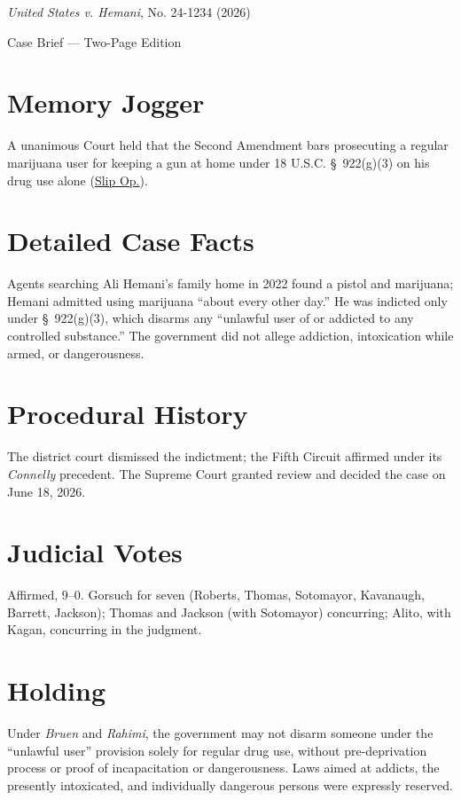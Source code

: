 \documentclass[12pt]{article}
\begin{document}
\begin{center}
{\LARGE \textit{United States v. Hemani}, No. 24-1234 (2026)\par}
\vspace{0.5em}
{\large Case Brief --- Two-Page Edition\par}
\end{center}

\section{Memory Jogger}
A unanimous Court held that the Second Amendment bars prosecuting a regular marijuana user for keeping a gun at home under 18 U.S.C. \S~922(g)(3) on his drug use alone (\href{https://www.supremecourt.gov/opinions/25pdf/24-1234_g2bh.pdf}{Slip Op.}).

\section{Detailed Case Facts}
Agents searching Ali Hemani's family home in 2022 found a pistol and marijuana; Hemani admitted using marijuana ``about every other day.'' He was indicted only under \S~922(g)(3), which disarms any ``unlawful user of or addicted to any controlled substance.'' The government did not allege addiction, intoxication while armed, or dangerousness.

\section{Procedural History}
The district court dismissed the indictment; the Fifth Circuit affirmed under its \textit{Connelly} precedent. The Supreme Court granted review and decided the case on June 18, 2026.

\section{Judicial Votes}
Affirmed, 9--0. Gorsuch for seven (Roberts, Thomas, Sotomayor, Kavanaugh, Barrett, Jackson); Thomas and Jackson (with Sotomayor) concurring; Alito, with Kagan, concurring in the judgment.

\section{Holding}
Under \textit{Bruen} and \textit{Rahimi}, the government may not disarm someone under the ``unlawful user'' provision solely for regular drug use, without pre-deprivation process or proof of incapacitation or dangerousness. Laws aimed at addicts, the presently intoxicated, and individually dangerous persons were expressly reserved.
\end{document}
